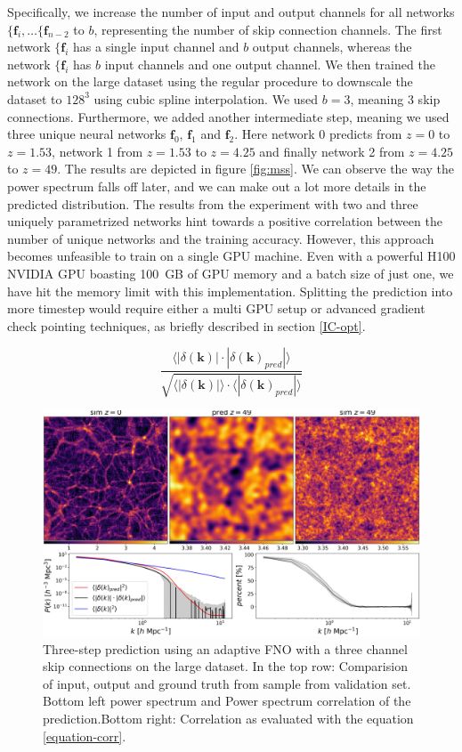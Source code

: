 \documentclass{article}
\begin{document}
Specifically, we increase the number of input and output channels for all networks $\{\mathbf{f}_i, \dots \{\mathbf{f}_{n-2}$ to $b$, representing the number of skip connection channels. The first network $\{\mathbf{f}_i$ has a single input channel and $b$ output channels, whereas the network $\{\mathbf{f}_i$ has $b$ input channels and one output channel. We then trained the network on the large dataset using the regular procedure to downscale the dataset to $128^3$ using cubic spline interpolation. We used $b=3$, meaning 3 skip connections. Furthermore, we added another intermediate step, meaning we used three unique neural networks $\mathbf{f}_0$, $\mathbf{f}_1$ and $\mathbf{f}_2$. Here network 0 predicts from $z=0$ to $z=1.53$, network 1 from $z=1.53$ to $z=4.25$ and finally network 2 from $z=4.25$ to $z=49$. The results are depicted in figure \ref{fig:mss}. We can observe the way the power spectrum falls off later, and we can make out a lot more details in the predicted distribution. The results from the experiment with two and three uniquely parametrized networks hint towards a positive correlation between the number of unique networks and the training accuracy. However, this approach becomes unfeasible to train on a single GPU machine. Even with a powerful H100 NVIDIA GPU boasting 100 GB of GPU memory and a batch size of just one, we have hit the memory limit with this implementation. Splitting the prediction into more timestep would require either a multi GPU setup or advanced gradient check pointing techniques, as briefly described in section \ref{IC-opt}. 


\begin{equation}
    \label{equation-corr}
    \frac{ \langle |\delta(\mathbf{k})| \cdot |\delta(\mathbf{k})_{pred}| \rangle }{ \sqrt{ \langle |\delta(\mathbf{k})| \rangle \cdot  \langle |\delta(\mathbf{k})_{pred}| \rangle }}
\end{equation}


\begin{figure}[h]
    \centering
    \includegraphics[width=0.9\linewidth]{img/eval_stats.jpg}
    \caption{Three-step prediction using an adaptive FNO with a three channel skip connections on the large dataset. In the top row: Comparision of input, output and ground truth from sample from validation set. Bottom left power spectrum and Power spectrum correlation of the prediction.Bottom right: Correlation as evaluated with the equation \ref{equation-corr}.}
    \label{fig:eval-stats}
\end{figure}
\end{document}
